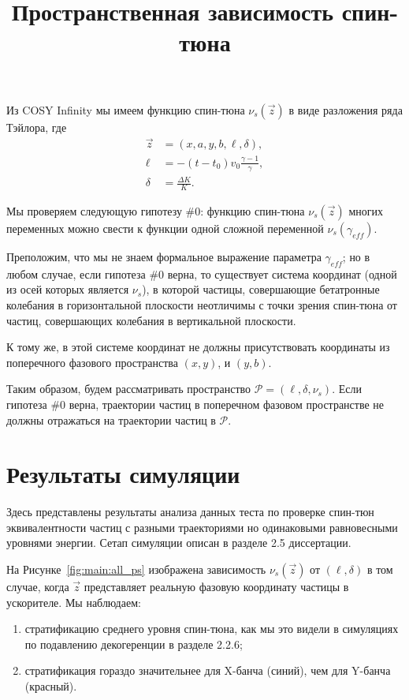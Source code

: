 \documentclass{article}
\newcommand{\geff}{\gamma_{eff}}
\newcommand{\Ps}{\mathcal P}
\begin{document}
\title{Пространственная зависимость спин-тюна}
\maketitle

Из COSY Infinity мы имеем функцию спин-тюна $\nu_s(\vec z)$ в виде разложения ряда Тэйлора, где
\begin{align*}
  \vec z &= (x,a,y,b,\ell,\delta), \\
  \ell &= -(t - t_0)v_0\frac{\gamma-1}{\gamma}, \\
  \delta &= \frac{\Delta K}{K}.
\end{align*}

Мы проверяем следующую гипотезу \#0: функцию спин-тюна $\nu_s(\vec z)$ многих переменных можно свести к
функции одной сложной переменной $\nu_s(\geff)$.

Преположим, что мы не знаем формальное выражение параметра $\geff$; но в любом случае, если гипотеза \#0 верна,
то существует система координат (одной из осей которых является $\nu_s$), в которой частицы,
совершающие бетатронные колебания в горизонтальной плоскости неотличимы с точки зрения спин-тюна от частиц,
совершающих колебания в вертикальной плоскости.

К тому же, в этой системе координат не должны присутствовать координаты из поперечного
фазового пространства $(x,y)$, и $(y,b)$.

Таким образом, будем рассматривать пространство $\Ps=(\ell, \delta, \nu_s)$. Если гипотеза \#0 верна,
траектории частиц в поперечном фазовом пространстве не должны отражаться на траектории частиц в $\Ps$.

\section{Результаты симуляции}
Здесь представлены результаты анализа данных теста по проверке спин-тюн эквивалентности частиц
с разными траекториями но одинаковыми равновесными уровнями энергии. Сетап симуляции описан в
разделе 2.5 диссертации.

На Рисунке~\ref{fig:main:all_ps} изображена зависимость $\nu_s(\vec z)$ от $(\ell, \delta)$ в том случае, когда
$\vec z$ представляет реальную фазовую координату частицы в ускорителе. Мы наблюдаем:
\begin{enumerate}
\item стратификацию среднего уровня спин-тюна, как мы это видели в симуляциях по подавлению декогеренции
  в разделе 2.2.6;
  \item стратификация гораздо значительнее для X-банча (синий), чем для Y-банча (красный).
\end{enumerate}
\end{document}
